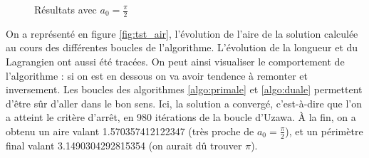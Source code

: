 \documentclass[10pt,a4paper]{article}
\theoremstyle{plain}
\theoremstyle{definition}
\begin{document}
\begin{figure}
{	}
	\caption{Résultats avec $a_0=\frac{\pi}{2}$}
\end{figure}

On a représenté en figure \ref{fig:tst_air}, l'évolution de l'aire de la solution calculée au cours des différentes boucles de l'algorithme. L'évolution de la longueur et du Lagrangien ont aussi été tracées. On peut ainsi visualiser le comportement de l'algorithme : si on est en dessous on va avoir tendence à remonter et inversement. Les boucles des algorithmes \ref{algo:primale} et \ref{algo:duale} permettent d'être sûr d'aller dans le bon sens. Ici, la solution a convergé, c'est-à-dire que l'on a atteint le critère d'arrêt, en 980 itérations de la boucle d'Uzawa. À la fin, on a obtenu un aire valant 1.570357412122347 (très proche de $a_0=\frac{\pi}{2}$), et un périmètre final valant 3.1490304292815354 (on aurait dû trouver $\pi$).
\end{document}
